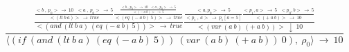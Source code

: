 \documentclass[11pt]{article}
\begin{document}
\begin{enumerate}
        \[
            \frac
            {
                \frac
                {
                    \frac
                    {
                        <b \ , \ p_0>\ \xrightarrow{} \ 10
                    \ \ \
                        <a \ , \ p_0> \ \xrightarrow{} \ 5
                    }
                    {<(lt\ b\ a)> \ \xrightarrow{} \ true}
                    \frac
                    {
                        \frac
                        {
                            <b \ , \ p_0>\ \xrightarrow{} \ 10
                        \ \ \
                            <a \ , \ p_0> \ \xrightarrow{} \ 5
                        }
                        {<(-\ a\ b)> \ \xrightarrow{} \ 5}
                    }
                    {<(eq\ (-\ a\ b)\ 5)> \ \xrightarrow{} \ true}
                }
                {
                    <(and\ (lt\ b\ a)\ (eq\ (-\ a\ b)\ 5))> \ \xrightarrow{} \ true
                }
                \frac
                {
                    \frac
                    {<a , p_0> \ \xrightarrow{} \ 5}
                    {<p_1 \ , \ a> \ \xrightarrow{} \ p_1[a = 5]}
                    \frac
                    {<p_1 , a>\ \xrightarrow{} \ 5 \ \ \ <p_0 , b> \ \xrightarrow{} \ 5}
                    {<(+\ a\ b)> \ \xrightarrow{} \ 10}
                }
                {<(var\ (a\ b)\ (+\ a\ b))> \ \downarrow \ 10}
            }
            {\langle (if\ (and\ (lt\ b\ a)\ (eq\ (-\ a\ b)\ 5))\ (var\ (a\ b)\ (+\ a\ b))\ 0),\ \rho_0 \rangle \ \xrightarrow{} \ 10}
        \]

    \end{enumerate}
\end{document}
